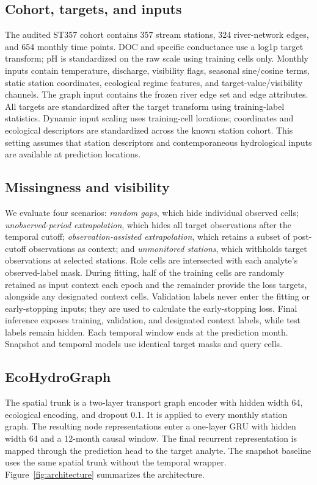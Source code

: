 \documentclass[11pt]{article}
\begin{document}
\subsection{Cohort, targets, and inputs}
The audited ST357 cohort contains 357 stream stations, 324 river-network edges, and 654 monthly time points. DOC and specific conductance use a log1p target transform; pH is standardized on the raw scale using training cells only. Monthly inputs contain temperature, discharge, visibility flags, seasonal sine/cosine terms, static station coordinates, ecological regime features, and target-value/visibility channels. The graph input contains the frozen river edge set and edge attributes. All targets are standardized after the target transform using training-label statistics. Dynamic input scaling uses training-cell locations; coordinates and ecological descriptors are standardized across the known station cohort. This setting assumes that station descriptors and contemporaneous hydrological inputs are available at prediction locations.

\subsection{Missingness and visibility}
We evaluate four scenarios: \textit{random gaps}, which hide individual observed cells; \textit{unobserved-period extrapolation}, which hides all target observations after the temporal cutoff; \textit{observation-assisted extrapolation}, which retains a subset of post-cutoff observations as context; and \textit{unmonitored stations}, which withholds target observations at selected stations. Role cells are intersected with each analyte's observed-label mask. During fitting, half of the training cells are randomly retained as input context each epoch and the remainder provide the loss targets, alongside any designated context cells. Validation labels never enter the fitting or early-stopping inputs; they are used to calculate the early-stopping loss. Final inference exposes training, validation, and designated context labels, while test labels remain hidden. Each temporal window ends at the prediction month. Snapshot and temporal models use identical target masks and query cells.

\subsection{EcoHydroGraph}
The spatial trunk is a two-layer transport graph encoder with hidden width 64, ecological encoding, and dropout 0.1. It is applied to every monthly station graph. The resulting node representations enter a one-layer GRU with hidden width 64 and a 12-month causal window. The final recurrent representation is mapped through the prediction head to the target analyte. The snapshot baseline uses the same spatial trunk without the temporal wrapper. Figure~\ref{fig:architecture} summarizes the architecture.
\end{document}
